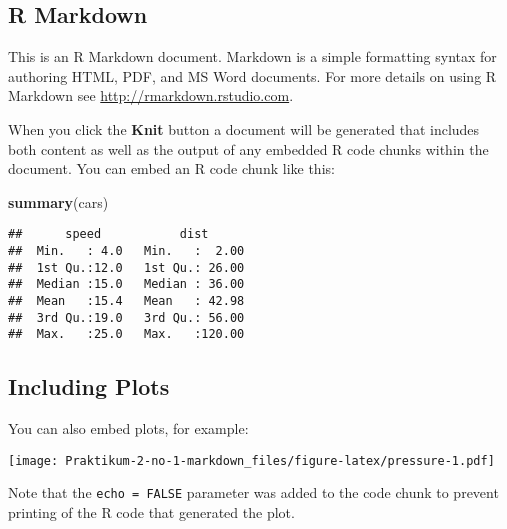 \documentclass[
]{article}
\newenvironment{Shaded}{\begin{snugshade}}{\end{snugshade}}
\newcommand{\FunctionTok}[1]{\textcolor[rgb]{0.13,0.29,0.53}{\textbf{#1}}}
\newcommand{\NormalTok}[1]{#1}
\begin{document}
\subsection{R Markdown}\label{r-markdown}

This is an R Markdown document. Markdown is a simple formatting syntax
for authoring HTML, PDF, and MS Word documents. For more details on
using R Markdown see \url{http://rmarkdown.rstudio.com}.

When you click the \textbf{Knit} button a document will be generated
that includes both content as well as the output of any embedded R code
chunks within the document. You can embed an R code chunk like this:

\begin{Shaded}
\begin{Highlighting}[]
\FunctionTok{summary}\NormalTok{(cars)}
\end{Highlighting}
\end{Shaded}

\begin{verbatim}
##      speed           dist       
##  Min.   : 4.0   Min.   :  2.00  
##  1st Qu.:12.0   1st Qu.: 26.00  
##  Median :15.0   Median : 36.00  
##  Mean   :15.4   Mean   : 42.98  
##  3rd Qu.:19.0   3rd Qu.: 56.00  
##  Max.   :25.0   Max.   :120.00
\end{verbatim}

\subsection{Including Plots}\label{including-plots}

You can also embed plots, for example:

\texttt{[image: Praktikum-2-no-1-markdown\_files/figure-latex/pressure-1.pdf]}

Note that the \texttt{echo\ =\ FALSE} parameter was added to the code
chunk to prevent printing of the R code that generated the plot.
\end{document}
